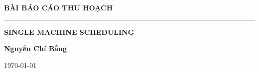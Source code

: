 \documentclass[12pt,a4paper]{report}
\begin{document}
 
    \begin{titlepage}
	\centering
    \phantom{}\par
	\vspace{3cm}
	{\LARGE\textbf{BÀI BÁO CÁO THU HOẠCH}\par}
	\vspace{1cm}
	\rule{5cm}{0.5pt}\par
	\vspace{1cm}
		{\LARGE\textbf{SINGLE MACHINE SCHEDULING}\par}
	\vspace{1cm}
	\Large\textbf{Nguyễn Chí Bằng}\par		
	\vspace{1cm}
    \today
    \end{titlepage}

	\tableofcontents
\end{document}
